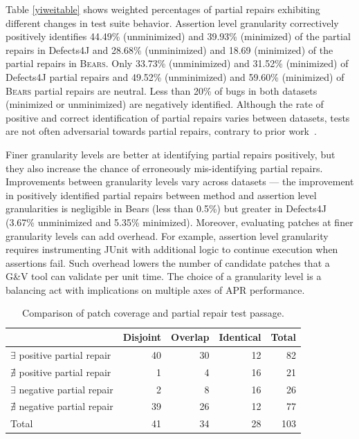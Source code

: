 \documentclass[10pt, conference]{IEEEtran}
\newcommand\bears{\textsc{Bears}\xspace}
\begin{document}
Table \ref{yiweitable} shows weighted percentages of partial repairs exhibiting
different changes in test suite behavior.
Assertion level granularity correctively positively identifies
44.49\% (unminimized) and 39.93\% (minimized) of the partial repairs in Defects4J
and 28.68\% (unminimized) and 18.69 (minimized) of the partial repairs in \bears.
Only 33.73\% (unminimized) and 31.52\% (minimized) of Defects4J partial repairs and 
49.52\% (unminimized) and 59.60\% (minimized)
of \bears partial repairs are neutral. Less than 20\% of bugs in both datasets
(minimized or unminimized) are negatively identified.
Although the rate of positive and correct identification of partial repairs varies between datasets,
tests are not often adversarial towards partial repairs, contrary to prior work~\cite{gecco09}.

Finer granularity levels are better at identifying partial repairs positively,
but they also increase the chance of erroneously mis-identifying partial repairs.
Improvements between granularity levels vary across datasets --- the improvement 
in positively identified partial repairs between method and assertion level granularities
is negligible in Bears (less than 0.5\%) but greater in Defects4J (3.67\% unminimized and 5.35\% minimized).
Moreover, evaluating patches at finer granularity levels can add overhead.
For example, assertion level granularity requires instrumenting JUnit with additional
logic to continue execution when assertions fail.
Such overhead lowers the number of
candidate patches that a G\&V tool can validate per unit time.
The choice of a granularity level is a balancing act with implications on
multiple axes of APR performance.

\begin{table}
        {\begin{center}
                        \begin{tabular} {lrrrr}
                                \toprule
                                & Disjoint & Overlap & Identical & Total \\
                                \midrule
                                $\exists$ positive partial repair & 40 & 30 & 12 & 82 \\
                                $\nexists$ positive partial repair & 1 & 4 & 16 &  21 \\
                \midrule
                                $\exists$ negative partial repair & 2 & 8 & 16 & 26 \\
                                $\nexists$ negative partial repair & 39 & 26 & 12 & 77 \\
                \midrule
                                Total & 41 & 34 & 28 & 103 \\
                \bottomrule
                        \end{tabular}
                \end{center}
        }
        \caption{Comparison of patch coverage and partial repair
        test passage.}
        \label{tab:cov_fitness}
\end{table}
\end{document}
